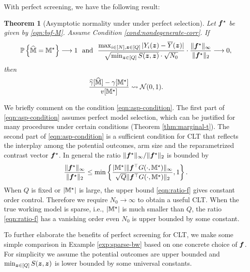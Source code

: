 \documentclass[12pt]{article}
\newtheorem{theorem}{Theorem}
\begin{document}
With perfect  screening, we have the following result:
\begin{theorem}[Asymptotic normality under under perfect selection]\label{thm:be-perfect-ms}
Let ${\boldsymbol{f}}^\star$ be given by \eqref{eqn:bsf-M}. Assume Condition \ref{cond:nondegenerate-corr}. If 
\begin{align}\label{eqn:asp-condition}
    {{\mathbb{P}}\left\{\widehat{{\mathbb{M}}} = {\mathbb{M}}^\star\right\}} \longrightarrow 1 ~ \text{ and } ~ \frac{  \max_{i\in[N],{\boldsymbol{z}}\in[Q]}|Y_i({\boldsymbol{z}})-\overline{Y}({\boldsymbol{z}})|}{\sqrt{\min_{{\boldsymbol{z}}\in[Q]} S({\boldsymbol{z}},{\boldsymbol{z}})}\cdot \sqrt{N_0}}\cdot  \frac{\|{{\boldsymbol{f}}}^\star\|_\infty}{\|{{\boldsymbol{f}}}^\star\|_2} \longrightarrow  0,
\end{align}
then 
\begin{align*}
    \frac{{\widehat{\gamma}}[\widehat{{\mathbb{M}}}] - \gamma[{\mathbb{M}}^\star]}{v[{\mathbb{M}}^\star]} \rightsquigarrow {\mathcal{N}}(0,1). 
\end{align*}
\end{theorem}
We briefly comment on the condition \eqref{eqn:asp-condition}. The first part of \eqref{eqn:asp-condition} assumes perfect model selection, which can be justified for many procedures under certain conditions (Theorem \ref{thm:marginal-t}). The second part of \eqref{eqn:asp-condition} is a sufficient condition for CLT that reflects the interplay among the potential outcomes, arm size and the reparametrized contrast vector ${\boldsymbol{f}}^\star$. In general the ratio 
$\|{\boldsymbol{f}}^\star\|_\infty/\|{\boldsymbol{f}}^\star\|_2 $ is bounded by 
\begin{align}\label{eqn:ratio-f}
    \frac{\|{\boldsymbol{f}}^\star\|_\infty}{\|{{\boldsymbol{f}}^\star}\|_2} \le \min\left\{\frac{|{\mathbb{M}}^\star|\|{\boldsymbol{f}}^\top G(\cdot,{\mathbb{M}}^\star)\|_\infty}{\sqrt{Q}\|{\boldsymbol{f}}^\top G(\cdot,{\mathbb{M}}^\star)\|_2},1\right\}.
\end{align}
When $Q$ is fixed or $|{\mathbb{M}}^\star|$ is large, the upper bound \eqref{eqn:ratio-f} gives constant order control. Therefore we require $N_0\to\infty$ to obtain a useful CLT. When the true working model is sparse, i.e., $|{\mathbb{M}}^\star|$ is much smaller than $Q$, the ratio \eqref{eqn:ratio-f} has a vanishing order {\color{red} even $N_0$ is upper bounded by some constant}. 


To further elaborate the benefits of perfect screening for CLT, we make some simple comparison in Example \ref{exp:sparse-bw} based on one concrete choice of ${\boldsymbol{f}}$.  For simplicity we assume the potential outcomes are upper bounded and $\min_{{\boldsymbol{z}}\in[Q]} S({\boldsymbol{z}},{\boldsymbol{z}})$ is lower bounded by some universal constants. 
\end{document}
